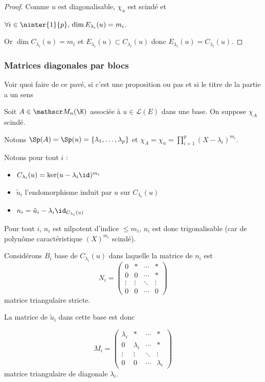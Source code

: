 \begin{proof}
    Comme $u$ est diagonalisable, $\chi_u$ est scindé et 
    
    $\forall i \in \ninter{1}{p}, \, \dim E_{\lambda_i}(u) = m_i$.

    Or $\dim C_{\lambda_i}(u) = m_i$ et $E_{\lambda_i}(u) \subset C_{\lambda_i}(u)$ donc 
    $E_{\lambda_i}(u) = C_{\lambda_i}(u)$.
\end{proof}


\subsubsection{Matrices diagonales par blocs}

Voir quoi faire de ce pavé, si c'est une proposition ou pas et si le titre de la partie a un sens 

Soit $A \in \mathscr M_n(\K)$ associée à $u \in \mathscr L(E)$ dans une base. On suppose 
$\chi_A$ scindé.

Notons $\Sp (A) = \Sp(u) = \{\lambda_1, \ldots, \lambda_p\}$ et 
$\chi_A = \chi_u = \displaystyle \prod_{i = 1 }^{ p } (X - \lambda_i)^{m_i}$.

Notons pour tout $i$ : 
\begin{itemize}
    \item $C_{\lambda_i}(u) = \ker (u - \lambda_i \id)^{m_i}$
    \item $\tilde u_i$ l'endomorphisme induit par $u$ sur $C_{\lambda_i}(u)$
    \item $n_i = \tilde u_i - \lambda_i \id_{C_{\lambda_i}(u)}$
\end{itemize}

Pour tout $i$, $n_i$ est nilpotent d'indice $\leqslant m_i$, 
$n_i$ est donc trigonalisable (car de polynôme caractéristique $(X)^{m_i}$ scindé).

Considérons $B_i$ base de $C_{\lambda_i}(u)$ dans laquelle la matrice de $n_i$ est 
$$N_i = \begin{pmatrix}
    0 & * & \cdots & * \\
    0 & 0 & \cdots & * \\
    \vdots & \vdots & \ddots & \vdots \\
    0 & 0 & \cdots & 0
\end{pmatrix}$$ matrice triangulaire stricte. 

La matrice de $\tilde u_i$ dans cette base est donc 

$$M_i = \begin{pmatrix}
    \lambda_i & * & \cdots & * \\
    0 & \lambda_i & \cdots & * \\
    \vdots & \vdots & \ddots & \vdots \\
    0 & 0 & \cdots & \lambda_i
\end{pmatrix}$$ matrice triangulaire de diagonale $\lambda_i$.

